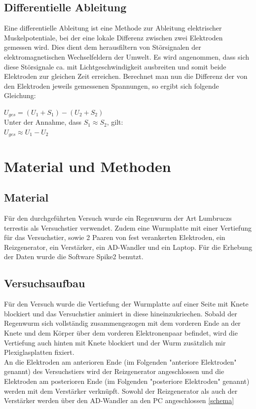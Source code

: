 \documentclass[11pt]{article}
\begin{document}
\subsection{Differentielle Ableitung}
Eine differentielle Ableitung ist eine Methode zur Ableitung elektrischer Muskelpotentiale, bei der eine lokale Differenz zwischen zwei Elektroden gemessen wird. Dies dient dem herausfiltern von Störsignalen der elektromagnetischen Wechselfeldern der Umwelt. Es wird angenommen, dass sich diese Störsignale ca. mit Lichtgeschwindigkeit ausbreiten und somit beide Elektroden zur gleichen Zeit erreichen. Berechnet man nun die Differenz der von den Elektroden jeweils gemessenen Spannungen, so ergibt sich folgende Gleichung:
\begin{center}
$U_{ges}= (U_1+S_1) - (U_2 + S_2)$ \\

Unter der Annahme, dass $S_1 \approx S_2$, gilt: \\

$U_{ges} \approx U_1 - U_2$
\end{center}




\section{Material und Methoden}
\subsection{Material}
Für den durchgeführten Versuch wurde ein Regenwurm der Art Lumbruczs terrestis als Versuchstier verwendet. Zudem eine Wurmplatte mit einer Vertiefung für das Versuchstier, sowie 2 Paaren von fest verankerten Elektroden, ein Reizgenerator, ein Verstärker, ein AD-Wandler und ein Laptop. Für die Erhebung der Daten wurde die Software Spike2 benutzt.
\subsection{Versuchsaufbau}
Für den Versuch wurde die Vertiefung der Wurmplatte auf einer Seite mit Knete blockiert und das Versuchstier animiert in diese hineinzukriechen. Sobald der Regenwurm sich vollständig zusammengezogen mit dem vorderen Ende an der Knete und dem Körper über dem vorderen Elektronenpaar befindet, wird die Vertiefung auch hinten mit Knete blockiert und der Wurm zusätzlich mir Plexiglasplatten fixiert.\\
An die Elektroden am anterioren Ende (im Folgenden "{}anteriore Elektroden"{} genannt) des Versuchstiers wird der Reizgenerator angeschlossen und die Elektroden am posterioren Ende (im Folgenden "{}posteriore Elektroden"{} genannt) werden mit dem Verstärker verknüpft. Sowohl der Reizgenerator als auch der Verstärker werden über den AD-Wandler an den PC angeschlossen \ref{schema}
\end{document}
